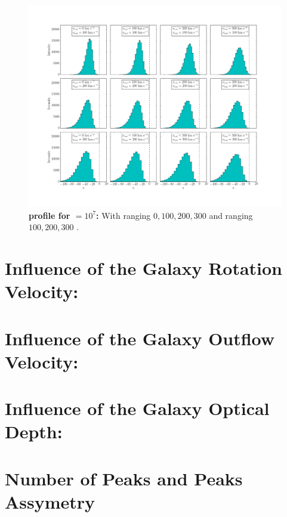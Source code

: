 \begin{figure}[h!]
	\begin{center}
		\includegraphics[width=1\textwidth]{./figures/tau10E7.png}
	\end{center}
	\caption{\textbf{\lya profile for \tauh$=10^7$:} With \vrot ranging $0,100,200,300$ \kms and \vout ranging $100,200,300$ \kms.
		\label{fig:tau10E7}}
\end{figure}

\section{Influence of the Galaxy Rotation Velocity: \vrot}


\section{Influence of the Galaxy Outflow Velocity: \vout}


\section{Influence of the Galaxy Optical Depth: \tauh}


\section{Number of Peaks and Peaks Assymetry}